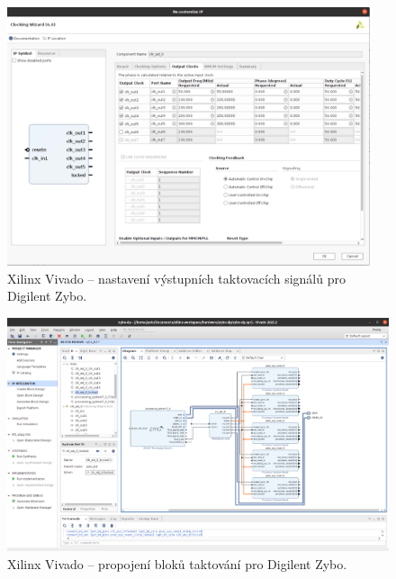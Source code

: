 \documentclass[a4paper, twoside, 11pt]{article}
\newcommand{\fbar}{\FloatBarrier}
\begin{document}
\begin{appendices}
		\begin{figure}[htbp!]
			\centering
			\includegraphics[width=0.95\textwidth]{src/png/zybo-xilinx-vivado-flow/zybo-xilinx-vivado-flow-36.jpg}
			\caption{Xilinx Vivado – nastavení výstupních taktovacích signálů pro Digilent Zybo.}
			\label{fig:zybo-xilinx-vivado-flow-36}
		\end{figure}

		\begin{figure}[htbp!]
			\centering
			\includegraphics[width=1\textwidth]{src/png/zybo-xilinx-vivado-flow/zybo-xilinx-vivado-flow-12.jpg}
			\caption{Xilinx Vivado – propojení bloků taktování pro Digilent Zybo.}
			\label{fig:zybo-xilinx-vivado-flow-12}
		\end{figure}

		\fbar


\end{appendices}
\end{document}
